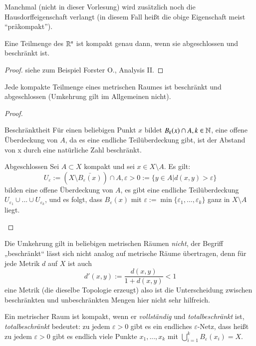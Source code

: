 \documentclass[a4paper,10pt]{scrartcl}
\newcommand{\eps}{\varepsilon}
\begin{document}
\begin{note}\label{thm:6.3}
 Manchmal (nicht in dieser Vorlesung) wird zusätzlich noch die Hausdorffeigenschaft verlangt (in diesem Fall heißt die obige Eigenschaft meist "`präkompakt"').
\end{note}
\begin{st}\label{thm:6.4}
 Eine Teilmenge des $\mathbb{R}^n$ ist kompakt genau dann, wenn sie abgeschlossen und beschränkt ist.
\end{st}
\begin{proof}
 siehe zum Beispiel Forster O., Analysis II.
\end{proof}
\begin{st}\label{thm:6.5}
 Jede kompakte Teilmenge eines metrischen Raumes ist beschränkt und abgeschlossen (Umkehrung gilt im Allgemeinen nicht).
\end{st}
\begin{proof}
 \begin{seg}{Beschränktheit}
  Für einen beliebigen Punkt $x$ bildet $B_k(x)\cap A, k \in \mathbb{N}$, eine offene Überdeckung von $A$, da es eine endliche Teilüberdeckung gibt, ist der Abstand von x durch eine natürliche Zahl beschränkt.
 \end{seg}
\begin{seg}{Abgeschlossen}
 Sei $A\subset X$ kompakt und sei $x\in X\setminus A$. Es gilt:
\[
 U_\eps:=(X\setminus\bar{B_\eps(x)})\cap A, \eps>0 := \{ y\in A|d(x,y) > \eps\}
\]
bilden eine offene Überdeckung von $A$, es gibt eine endliche Teilüberdeckung $U_{\eps_1}\cup... \cup U_{\eps_k}$, und es folgt, dass $B_\eps(x)$ mit $\eps:=\min\{\eps_1,...,\eps_k\}$ ganz in $X\setminus A$ liegt.

\fixme[fig26]
\end{seg}
\end{proof}
Die Umkehrung gilt in beliebigen metrischen Räumen \emph{nicht}, der Begriff „beschränkt“ lässt sich nicht analog auf metrische Räume übertragen, denn für jede Metrik $d$ auf $X$ ist auch
\[
 d'(x,y):=\frac{d(x,y)}{1+d(x,y)}<1
\]
eine Metrik (die dieselbe Topologie erzeugt) also ist die Unterscheidung zwischen beschränkten und unbeschränkten Mengen hier nicht sehr hilfreich.
\begin{note*}
 Ein metrischer Raum ist kompakt, wenn er \emph{vollständig} und \emph{totalbeschränkt} ist, \emph{totalbeschränkt} bedeutet: zu jedem $\eps>0$ gibt es ein endliches $\eps$-Netz, dass heißt zu jedem $\eps>0$ gibt es endlich viele Punkte $x_1,...,x_k$ mit $\bigcup_{i=1}^kB_\eps(x_i)=X$.
\end{note*}
\end{document}
